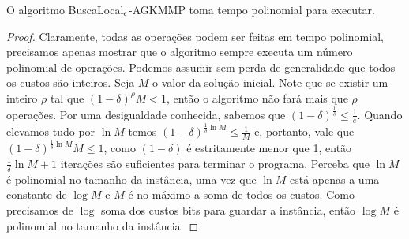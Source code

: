 \begin{theorem}
    O algoritmo {\sc BuscaLocal$_\epsilon$-AGKMMP} toma tempo polinomial para executar.
\end{theorem}
\begin{proof}
    Claramente, todas as operações podem ser feitas em tempo polinomial, precisamos apenas mostrar que o algoritmo sempre executa um número polinomial de operações.
    Podemos assumir sem perda de generalidade que todos os custos são inteiros. Seja $M$ o valor da solução inicial. Note que se existir um inteiro $\rho$ tal que $(1-\delta)^\rho M < 1$, então o algoritmo não fará mais que $\rho$ operações. Por uma desigualdade conhecida, sabemos que $(1 - \delta)^{\frac{1}{\delta}} \leq \frac{1}{e}$. Quando elevamos tudo por $\ln M$ temos $(1- \delta)^{\frac{1}{\delta}\ln M} \leq \frac{1}{M}$ e, portanto, vale que $ (1- \delta)^{\frac{1}{\delta}\ln M}M \leq 1$, como $(1-\delta)$ é estritamente menor que 1, então $\frac{1}{\delta}\ln M + 1$ iterações são suficientes para terminar o programa. Perceba que $\ln M$ é polinomial no tamanho da instância, uma vez que $\ln M$ está apenas a uma constante de $\log M$ e $M$ é no máximo a soma de todos os custos. Como precisamos de $\log$ soma dos custos bits para guardar a instância, então $\log M$ é polinomial no tamanho da instância.
\end{proof}